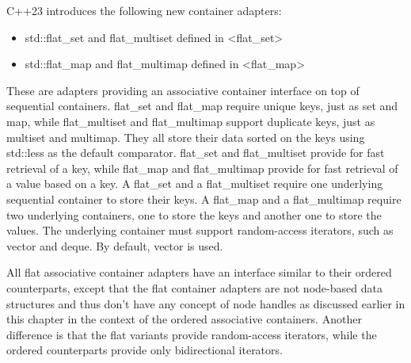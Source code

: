 

C++23 introduces the following new container adapters:

\begin{itemize}
\item
std::flat\_set and flat\_multiset defined in <flat\_set>

\item
std::flat\_map and flat\_multimap defined in <flat\_map>
\end{itemize}

These are adapters providing an associative container interface on top of sequential containers.
flat\_set and flat\_map require unique keys, just as set and map, while flat\_multiset and flat\_multimap support duplicate keys, just as multiset and multimap. They all store their data sorted on the keys using std::less as the default comparator. flat\_set and flat\_multiset provide for fast retrieval of a key, while flat\_map and flat\_multimap provide for fast retrieval of a value based on a key. A flat\_set and a flat\_multiset require one underlying sequential container to store their keys. A flat\_map and a flat\_multimap require two underlying containers, one to store the keys and another one to store the values. The underlying container must support random-access iterators, such as vector and deque. By default, vector is used.

All flat associative container adapters have an interface similar to their ordered counterparts, except that the flat container adapters are not node-based data structures and thus don’t have any concept of node handles as discussed earlier in this chapter in the context of the ordered associative containers. Another difference is that the flat variants provide random-access iterators, while the ordered counterparts provide only bidirectional iterators.

